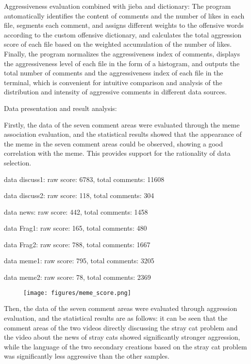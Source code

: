 \documentclass[12pt,a4paper]{ctexart}
\theoremstyle{MyLineTheoremStyle}
\theoremstyle{MyBlockTheoremStyle}
\theoremstyle{MySubsubsectionStyle}
\begin{document}
Aggressiveness evaluation combined with jieba and dictionary: The program automatically identifies the content of comments and the number of likes in each file, segments each comment, and assigns different weights to the offensive words according to the custom offensive dictionary, and calculates the total aggression score of each file based on the weighted accumulation of the number of likes. Finally, the program normalizes the aggressiveness index of comments, displays the aggressiveness level of each file in the form of a histogram, and outputs the total number of comments and the aggressiveness index of each file in the terminal, which is convenient for intuitive comparison and analysis of the distribution and intensity of aggressive comments in different data sources.

Data presentation and result analysis:

Firstly, the data of the seven comment areas were evaluated through the meme association evaluation, and the statistical results showed that the appearance of the meme in the seven comment areas could be observed, showing a good correlation with the meme. This provides support for the rationality of data selection.

data discuss1: raw score: 6783, total comments: 11608

data discuss2: raw score: 118, total comments: 304

data news: raw score: 442, total comments: 1458

data Frag1: raw score: 165, total comments: 480

data Frag2: raw score: 788, total comments: 1667

data meme1: raw score: 795, total comments: 3205

data meme2: raw score: 78, total comments: 2369

\begin{figure}[htbp]
    \centering
    \texttt{[image: figures/meme\_score.png]}
\end{figure}
\newpage

Then, the data of the seven comment areas were evaluated through aggression evaluation, and the statistical results are as follows: it can be seen that the comment areas of the two videos directly discussing the stray cat problem and the video about the news of stray cats showed significantly stronger aggression, while the language of the two secondary creations based on the stray cat problem was significantly less aggressive than the other samples.
\end{document}
